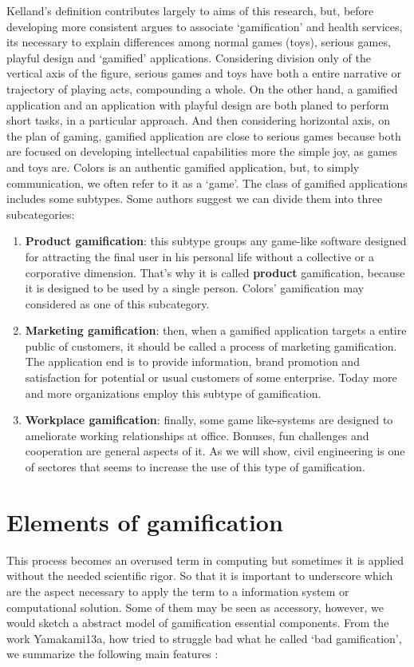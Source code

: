 Kelland's definition contributes largely to aims of this research, but, before developing more consistent argues to associate `gamification' and health services, its necessary to explain differences among normal games (toys), serious games, playful design and `gamified' applications. Considering division only of the vertical axis of the figure, serious games and toys have both a entire narrative or trajectory of playing acts, compounding a whole. On the other hand, a gamified application and an application with playful design are both planed to perform short tasks, in a particular approach. And then considering horizontal axis, on the plan of gaming, gamified application are close to serious games because both are focused on developing intellectual capabilities more the simple joy, as games and toys are.  Colors is an authentic gamified application, but, to simply communication, we often refer to it as a `game'. The class of gamified applications includes some subtypes. Some authors suggest we can divide them into three subcategories:

\begin{enumerate}
\item \textbf{Product gamification}: this subtype groups any game-like software designed for attracting the final user in his personal life without a collective or a corporative dimension. That's why it is called \textbf{product} gamification, because it is designed to be used by a single person. Colors' gamification may considered as one of this subcategory.
\item \textbf{Marketing gamification}: then, when a gamified application targets a entire public of customers, it should be called a process of marketing gamification. The application end is to provide information, brand promotion and satisfaction for potential or usual customers of some enterprise. Today more and more organizations employ this subtype of gamification.
\item \textbf{Workplace gamification}: finally, some game like-systems are designed to ameliorate working relationships at office. Bonuses, fun challenges and cooperation are general aspects of it. As we will show, civil engineering is one of sectores that seems to increase the use of this type of gamification. 
\end{enumerate}

\section{Elements of gamification}
This process becomes an overused term in computing but sometimes it is applied without the needed scientific rigor. So that it is important to underscore which are the aspect necessary to apply the term to a information system or computational solution. Some of them may be seen as accessory, however, we would sketch a abstract model of gamification essential components. From the work Yamakami13a, how tried to struggle bad what he called `bad gamification', we summarize the following main features \citep{conf/mue/Yamakami13a}:

